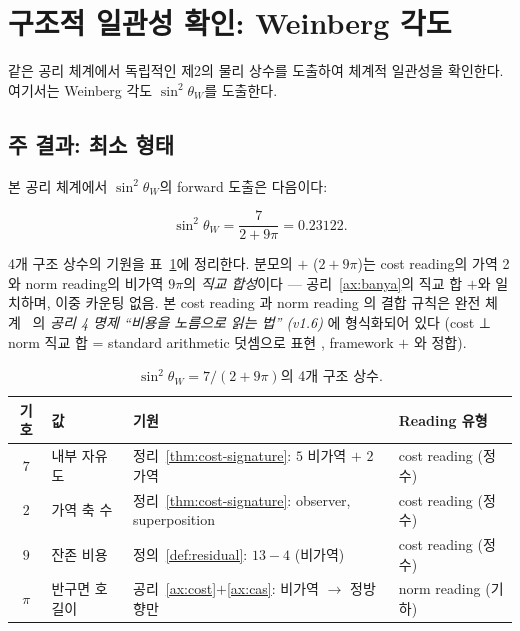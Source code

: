 \documentclass[entropy,article,submit,pdftex,oneauthor]{Definitions/mdpi}
\begin{document}
\section{구조적 일관성 확인: Weinberg 각도}
\label{sec:prediction}

같은 공리 체계에서 독립적인 제2의 물리 상수를 도출하여 체계적 일관성을 확인한다. 여기서는 Weinberg 각도 $\sin^2\theta_W$를 도출한다.

\subsection{주 결과: 최소 형태}

본 공리 체계에서 $\sin^2\theta_W$의 forward 도출은 다음이다:
\begin{linenomath}
\begin{equation}
\boxed{\sin^2\theta_W = \frac{7}{2 + 9\pi} = 0.23122.}
\label{eq:weinberg-main}
\end{equation}
\end{linenomath}

4개 구조 상수의 기원을 표~\ref{tab:weinberg-constants}에 정리한다. 분모의 $+$ ($2 + 9\pi$)는 cost reading의 가역 2와 norm reading의 비가역 $9\pi$의 \emph{직교 합성}이다 — 공리~\ref{ax:banya}의 직교 합 $+$와 일치하며, 이중 카운팅 없음. 본 cost reading 과 norm reading 의 결합 규칙은 완전 체계~\cite{han2026} 의 \emph{공리 4 명제 ``비용을 노름으로 읽는 법'' (v1.6)} 에 형식화되어 있다 (cost ⊥ norm 직교 합 = standard arithmetic 덧셈으로 표현 , framework $+$ 와 정합).

\begin{table}[H]
\caption{$\sin^2\theta_W = 7/(2+9\pi)$의 4개 구조 상수.\label{tab:weinberg-constants}}
\small
\begin{tabular}{clll}
\toprule
\textbf{기호} & \textbf{값} & \textbf{기원} & \textbf{Reading 유형} \\
\midrule
$7$ & 내부 자유도 & 정리~\ref{thm:cost-signature}: $5$ 비가역 $+$ $2$ 가역 & cost reading (정수) \\
$2$ & 가역 축 수 & 정리~\ref{thm:cost-signature}: observer, superposition & cost reading (정수) \\
$9$ & 잔존 비용 & 정의~\ref{def:residual}: $13-4$ (비가역) & cost reading (정수) \\
$\pi$ & 반구면 호 길이 & 공리~\ref{ax:cost}$+$\ref{ax:cas}: 비가역 $\to$ 정방향만 & norm reading (기하) \\
\bottomrule
\end{tabular}
\end{table}
\end{document}

